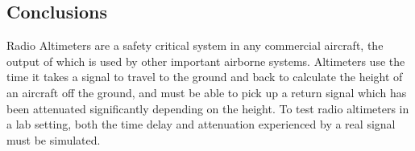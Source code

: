 \subsection{Conclusions}
Radio Altimeters are a safety critical system in any commercial aircraft, the output of which is used by other important airborne systems. Altimeters use the time it takes a signal to travel to the ground and back to calculate the height of an aircraft off the ground, and must be able to pick up a return signal which has been attenuated significantly depending on the height. To test radio altimeters in a lab setting, both the time delay and attenuation experienced by a real signal must be simulated. 


